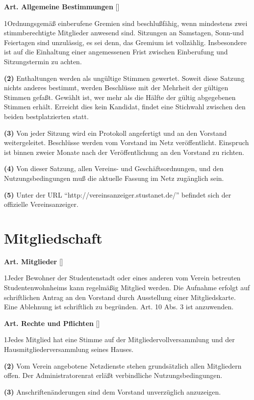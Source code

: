 \documentclass[12pt]{article}
\newcommand{\Abschnitt}[1]{\section{#1}}
\newcommand{\Satz}[2]{

\begin{samepage}
{\bf (#1)} #2
\end{samepage}
}
\newenvironment{Artikel}[2]{
\bigskip \centerline{{\bf Art. #1} [#2]}
\nopagebreak
}{
}
\begin{document}
\begin{Artikel}{5}{Allgemeine Bestimmungen}

\Satz{1}{Ordnungsgemäß einberufene Gremien sind beschlußfähig, wenn mindestens zwei stimmberechtigte Mitglieder anwesend sind.
  Sitzungen an Samstagen, Sonn-und Feiertagen sind unzulässig, es sei denn, das Gremium ist vollzählig.
  Insbesondere ist auf die Einhaltung einer angemessenen Frist zwischen Einberufung und Sitzungstermin zu achten.}

\Satz{2}{Enthaltungen werden als ungültige Stimmen gewertet.
  Soweit diese Satzung nichts anderes bestimmt, werden Beschlüsse mit der Mehrheit der gültigen Stimmen gefaßt.
  Gewählt ist, wer mehr als die Hälfte der gültig abgegebenen Stimmen erhält.
  Erreicht dies kein Kandidat, findet eine Stichwahl zwischen den beiden bestplatzierten statt.}

\Satz{3}{Von jeder Sitzung wird ein Protokoll angefertigt und an den Vorstand weitergeleitet.
  Beschlüsse werden vom Vorstand im Netz veröffentlicht.
  Einspruch ist binnen zweier Monate nach der Veröffentlichung an den Vorstand zu richten.}

\Satz{4}{Von dieser Satzung, allen Vereins- und Geschäftsordnungen, und den Nutzungsbedingungen muß die aktuelle Fassung im Netz zugänglich sein.}

\Satz{5}{Unter der URL "`http://vereinsanzeiger.stustanet.de/"' befindet sich der offizielle Vereinsanzeiger.}

\end{Artikel}

\Abschnitt{Mitgliedschaft}

\begin{Artikel}{6}{Mitglieder}

\Satz{1}{Jeder Bewohner der Studentenstadt oder eines anderen vom Verein betreuten Studentenwohnheims kann regelmäßig Mitglied werden.
  Die Aufnahme erfolgt auf schriftlichen Antrag an den Vorstand durch Ausstellung einer Mitgliedskarte.
  Eine Ablehnung ist schriftlich zu begründen.
  Art. 10 Abs. 3 ist anzuwenden.}

\end{Artikel}

\begin{Artikel}{7}{Rechte und Pflichten}

\Satz{1}{Jedes Mitglied hat eine Stimme auf der Mitgliedervollversammlung und
der Hausmitgliederversammlung seines Hauses.}

\Satz{2}{Vom Verein angebotene Netzdienste stehen grundsätzlich allen Mitgliedern offen.
  Der Administratorenrat erläßt verbindliche Nutzungsbedingungen.}

\Satz{3}{Anschriftenänderungen sind dem Vorstand unverzüglich anzuzeigen.}

\end{Artikel}
\end{document}

